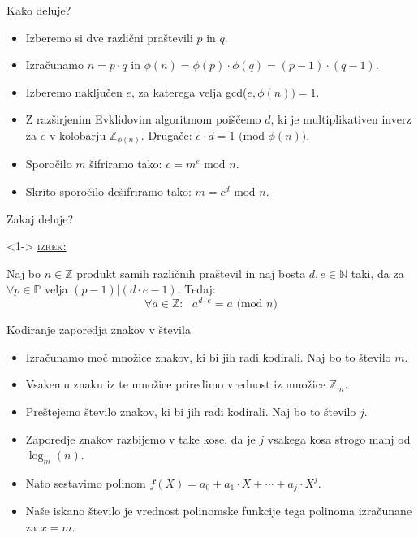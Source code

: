 \documentclass[a4paper, 12pt]{beamer} %
\newenvironment{matematika}[1]{
\textcolor{bostonuniversityred}{\underline{\textsc{#1:}}}
}{
}
\begin{document}
\begin{frame}{Kako deluje?}
\begin{itemize}[label=]
\item<1-> Izberemo si dve različni praštevili $p$ in $q$.
\item<2-> Izračunamo $n = p \cdot q$ in $\phi(n) = \phi(p) \cdot \phi(q) = (p-1) \cdot (q-1).$
\item<3-> Izberemo naključen $e$, za katerega velja gcd($e, \phi(n)) = 1$.
\item<4-> Z razširjenim Evklidovim algoritmom poiščemo $d$, ki je multiplikativen inverz za $e$ v kolobarju $\mathbb{Z}_{\phi(n)}$. Drugače: $e \cdot d = 1 \text{ (mod } \phi(n))$.
\item<5-> Sporočilo $m$ šifriramo tako: $c = m^e \text{ mod } n$.
\item<6-> Skrito sporočilo dešifriramo tako: $m = c^d \text{ mod } n$.
\end{itemize}
\end{frame}

\begin{frame}{Zakaj deluje?}
\begin{block}<1->{}
\begin{matematika}{izrek}
Naj bo $n \in \mathbb{Z}$ produkt samih različnih praštevil in naj bosta $d, e\in \mathbb{N}$ taki, da za $\forall p \in \mathbb{P}$ velja $(p-1) | (d \cdot e - 1)$. Tedaj:
\newline
\[
\forall a \in \mathbb{Z}: \text{ } a^{d \cdot e} = a \text{ (mod }n)
\]
\end{matematika}
\end{block}
\end{frame}

\begin{frame}{Kodiranje zaporedja znakov v števila}
\begin{itemize}[label=]
\item<1-> Izračunamo moč množice znakov, ki bi jih radi kodirali. Naj bo to število $m$.
\item<2-> Vsakemu znaku iz te množice priredimo vrednost iz množice $\mathbb{Z}_m$.
\item<3-> Preštejemo število znakov, ki bi jih radi kodirali. Naj bo to število $j$.
\item<4-> Zaporedje znakov razbijemo v take kose, da je $j$ vsakega kosa strogo manj od $\log_{m}(n)$.
\item<4-> Nato sestavimo polinom $f(X) = a_0 + a_1 \cdot X + \cdots + a_j \cdot X^j$. 
\item<5-> Naše iskano število je vrednost polinomske funkcije tega polinoma izračunane za $x = m$.
\end{itemize}
\end{frame}
\end{document}
